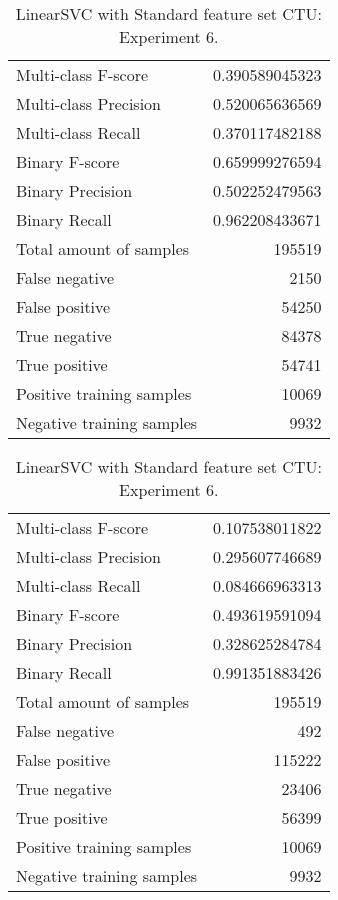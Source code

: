 \begin{table}[H]
\begin{minipage}{0.5\textwidth}
\caption{LinearSVC with Standard feature set CTU: Experiment 5.}
\centering
\begin{tabular}{l r}
\toprule
Multi-class F-score & 0.390589045323 \\
Multi-class Precision & 0.520065636569 \\
Multi-class Recall & 0.370117482188 \\
\midrule
Binary F-score & 0.659999276594 \\
Binary Precision & 0.502252479563 \\
Binary Recall & 0.962208433671 \\
\midrule
Total amount of samples & 195519 \\
False negative & 2150 \\
False positive & 54250 \\
True negative & 84378 \\
True positive & 54741 \\
\midrule
Positive training samples & 10069 \\
Negative training samples & 9932 \\
\bottomrule
\end{tabular}
\end{minipage}
\hfillx
\begin{minipage}{0.5\textwidth}
\caption{LinearSVC with Standard feature set CTU: Experiment 6.}
\centering
\begin{tabular}{l r}
\toprule
Multi-class F-score & 0.107538011822 \\
Multi-class Precision & 0.295607746689 \\
Multi-class Recall & 0.084666963313 \\
\midrule
Binary F-score & 0.493619591094 \\
Binary Precision & 0.328625284784 \\
Binary Recall & 0.991351883426 \\
\midrule
Total amount of samples & 195519 \\
False negative & 492 \\
False positive & 115222 \\
True negative & 23406 \\
True positive & 56399 \\
\midrule
Positive training samples & 10069 \\
Negative training samples & 9932 \\
\bottomrule
\end{tabular}
\end{minipage}
\end{table}
